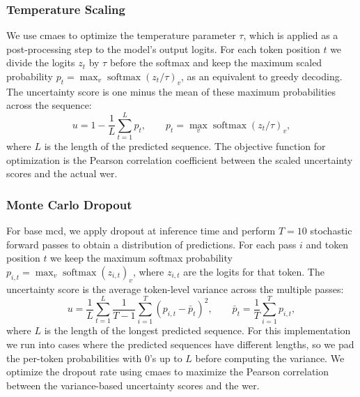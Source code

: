 \documentclass[11pt]{article}
\begin{document}
\subsubsection{Temperature Scaling}
We use \acrshort{cmaes} to optimize the temperature parameter $\tau$, which is applied as a post-processing step to the model's output logits. For each token position $t$ we divide the logits $z_t$ by $\tau$ before the softmax and keep the maximum scaled probability $p_t = \max_v \operatorname{softmax}(z_t / \tau)_v$, as an equivalent to greedy decoding. The uncertainty score is one minus the mean of these maximum probabilities across the sequence:
\begin{equation}
    u = 1 - \frac{1}{L}\sum_{t=1}^{L} p_t,
    \qquad p_t = \max_v \operatorname{softmax}(z_t / \tau)_v,
\end{equation}
where $L$ is the length of the predicted sequence. The objective function for optimization is the Pearson correlation coefficient between the scaled uncertainty scores and the actual \acrshort{wer}.

\subsubsection{Monte Carlo Dropout}
For base \acrshort{mcd}, we apply dropout at inference time and perform $T = 10$ stochastic forward passes to obtain a distribution of predictions. For each pass $i$ and token position $t$ we keep the maximum softmax probability $p_{i,t} = \max_v \operatorname{softmax}(z_{i,t})_v$, where $z_{i,t}$ are the logits for that token. The uncertainty score is the average token-level variance across the multiple passes:
\begin{equation}
    u = \frac{1}{L}\sum_{t=1}^{L} \frac{1}{T-1}\sum_{i=1}^{T}\left(p_{i,t} - \bar{p}_t\right)^2,
    \qquad \bar{p}_t = \frac{1}{T}\sum_{i=1}^{T} p_{i,t},
\end{equation}
where $L$ is the length of the longest predicted sequence.
For this implementation we run into cases where the predicted sequences have different lengths, so we pad the per-token probabilities with 0's up to $L$ before computing the variance.
We optimize the dropout rate using \acrshort{cmaes} to maximize the Pearson correlation between the variance-based uncertainty scores and the \acrshort{wer}.
\end{document}
